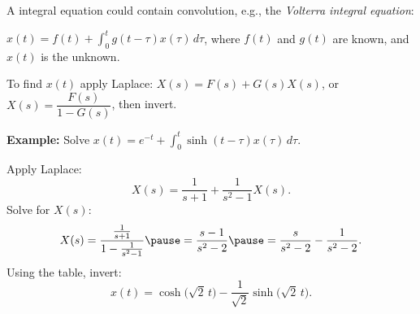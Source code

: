 \documentclass[10pt,aspectratio=169]{beamer}
\begin{document}
\begin{frame}
A integral equation could contain convolution, e.g., 
the \emph{Volterra integral equation}:

\medskip

\quad
$\displaystyle
x(t) = f(t) + \int_0^t g(t-\tau) x(\tau) \, d\tau$,
\quad 
where $f(t)$ and $g(t)$ are known,
and $x(t)$ is the unknown.

\medskip
\pause

To find $x(t)$ apply Laplace:
\quad
$X(s) = F(s) + G(s) X(s)$,
\pause
\quad
or
\quad
$X(s) = \dfrac{F(s)}{1-G(s)}$, \pause \quad then invert.

\medskip
\pause

\textbf{Example:}
Solve
\quad
$\displaystyle
x(t) =  e^{-t} + \int_0^t \sinh(t-\tau) x(\tau) \, d\tau$.

\medskip
\pause

Apply Laplace:
\[
X(s) = \frac{1}{s+1} + \frac{1}{s^2-1} X(s) .
\]
\pause
Solve for $X(s)$:
\[
X(s) = \frac{\frac{1}{s+1}}{1- \frac{1}{s^2-1}}
\pause
=
\frac{s-1}{s^2 - 2}
\pause
=
\frac{s}{s^2 - 2}
-
\frac{1}{s^2 - 2} .
\]
\pause
Using the table, invert:
\[
x(t) = \cosh \bigl( \sqrt{2} \, t \bigr) -
\frac{1}{\sqrt{2}} \sinh \bigl( \sqrt{2}\, t \bigr).
\]

\end{frame}
\end{document}

